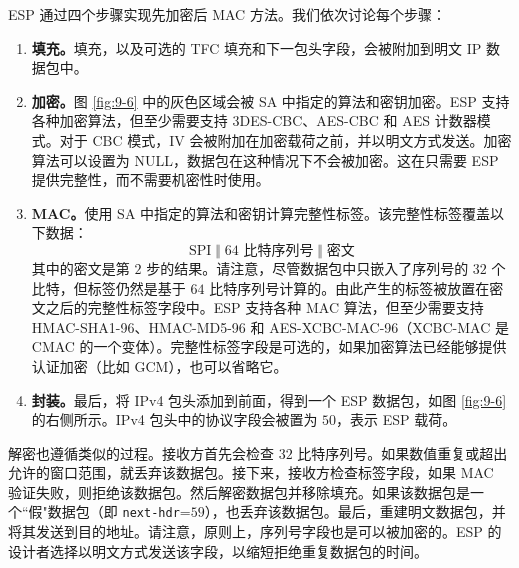 \begin{snote}[加密过程。]
ESP 通过四个步骤实现先加密后 MAC 方法。我们依次讨论每个步骤：
\begin{enumerate}
	\item \textbf{填充。}填充，以及可选的 TFC 填充和下一包头字段，会被附加到明文 IP 数据包中。
	\item \textbf{加密。}图 \ref{fig:9-6} 中的灰色区域会被 SA 中指定的算法和密钥加密。ESP 支持各种加密算法，但至少需要支持 3DES-CBC、AES-CBC 和 AES 计数器模式。对于 CBC 模式，IV 会被附加在加密载荷之前，并以明文方式发送。加密算法可以设置为 NULL，数据包在这种情况下不会被加密。这在只需要 ESP 提供完整性，而不需要机密性时使用。
	\item \textbf{MAC。}使用 SA 中指定的算法和密钥计算完整性标签。该完整性标签覆盖以下数据：
		\[
			\mathrm{SPI}\;\Vert\;\text{64 比特序列号}\;\Vert\;\text{密文}
		\]
	其中的密文是第 $2$ 步的结果。请注意，尽管数据包中只嵌入了序列号的 $32$ 个比特，但标签仍然是基于 $64$ 比特序列号计算的。由此产生的标签被放置在密文之后的完整性标签字段中。ESP 支持各种 MAC 算法，但至少需要支持 HMAC-SHA1-96、HMAC-MD5-96 和 AES-XCBC-MAC-96（XCBC-MAC 是 CMAC 的一个变体）。完整性标签字段是可选的，如果加密算法已经能够提供认证加密（比如 GCM），也可以省略它。
	\item \textbf{封装。}最后，将 IPv4 包头添加到前面，得到一个 ESP 数据包，如图 \ref{fig:9-6} 的右侧所示。IPv4 包头中的协议字段会被置为 $50$，表示 ESP 载荷。
\end{enumerate}

解密也遵循类似的过程。接收方首先会检查 $32$ 比特序列号。如果数值重复或超出允许的窗口范围，就丢弃该数据包。接下来，接收方检查标签字段，如果 MAC 验证失败，则拒绝该数据包。然后解密数据包并移除填充。如果该数据包是一个``假"数据包（即 \texttt{next-hdr}=$59$），也丢弃该数据包。最后，重建明文数据包，并将其发送到目的地址。请注意，原则上，序列号字段也是可以被加密的。ESP 的设计者选择以明文方式发送该字段，以缩短拒绝重复数据包的时间。
\end{snote}

